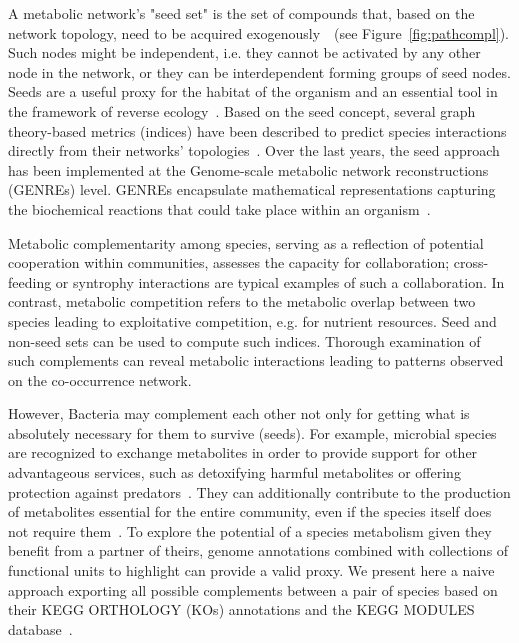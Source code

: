 \documentclass[sn-mathphys,Numbered]{sn-jnl}  %
\theoremstyle{thmstyleone}%
\theoremstyle{thmstyletwo}%
\theoremstyle{thmstylethree}%
\begin{document}
    A metabolic network's "seed set" is the set of compounds that, based on the network topology, need to be acquired exogenously~\cite{borenstein2008large}~(see Figure~\ref{fig:pathcompl}).
    Such nodes might be independent, i.e. they cannot be activated by any other node in the network, or they can be interdependent forming groups of seed nodes.
    Seeds are a useful proxy for the habitat of the organism and an essential tool in the framework of reverse ecology~\cite{parter2007environmental,borenstein2008large}.
    Based on the seed concept, several graph theory-based metrics (indices) have been described to predict species interactions directly from their networks' topologies~\cite{levy2015netcooperate, kreimer2012netcmpt, zelezniak2015metabolic, belcour2020metage2metabo}.
    Over the last years, the seed approach has been implemented at the Genome-scale metabolic network reconstructions (GENREs) level.
    GENREs encapsulate mathematical representations capturing the biochemical reactions that could take place within an organism~\cite{thiele2010protocol, durot2008genome, communityGemMicrobiomeModel2023}.

    Metabolic complementarity among species, serving as a reflection of potential cooperation within communities, assesses the capacity for collaboration; cross-feeding or syntrophy interactions are typical examples of such a collaboration. 
    In contrast, metabolic competition refers to the metabolic overlap between two species leading to exploitative competition, e.g. for nutrient resources.
    Seed and non-seed sets can be used to compute such indices. 
    Thorough examination of such complements can reveal metabolic interactions leading to patterns observed on the co-occurrence network.
    
    However, Bacteria may complement each other not only for getting what is absolutely necessary for them to survive (seeds).
    For example, microbial species are recognized to exchange metabolites in order to provide support for other advantageous services, such as detoxifying harmful metabolites or offering protection against predators~\cite{little2008rules, zientz2004metabolic}.
    They can additionally contribute to the production of metabolites essential for the entire community, even if the species itself does not require them~\cite{kallus2017paradoxes}.
    To explore the potential of a species metabolism given they benefit from a partner of theirs, genome annotations combined with collections of functional units to highlight can provide a valid proxy.
    We present here a naive approach exporting all possible complements between a pair of species based on their KEGG ORTHOLOGY (KOs) annotations and the KEGG MODULES database~\cite{keggmodulesdb}.
\end{document}
